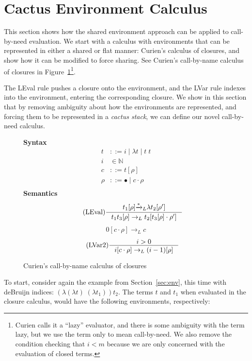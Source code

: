 \section{Cactus Environment Calculus} \label{sec:calc}

This section shows how the shared environment approach can be applied to
call-by-need evaluation. We start with a calculus with environments that can be
represented in either a shared or flat manner: Curien's calculus of closures,
and show how it can be modified to force sharing. See Curien's call-by-name
calculus of closures in Figure~\ref{fig:calcclos}\footnote{Curien calls it a
``lazy'' evaluator, and there is some ambiguity with the term lazy, but we use the
term only to mean call-by-need. We also remove the condition checking that $i <
m$ because we are only concerned with the evaluation of closed terms.}.

The LEval rule pushes a closure onto the environment, and the LVar rule indexes
into the environment, entering the corresponding closure. We show in this
section that by removing ambiguity about how the environments are represented,
and forcing them to be represented in a \emph{cactus stack}, we can define our
novel call-by-need calculus.

\begin{figure}
\textbf{Syntax}
\begin{align*}
\tag{Term} t &::= i \; | \; \lambda t \; | \; t \; t  \\
\tag{Variable} i &\in \mathbb{N}  \\
\tag{Closure} c &::= t [\rho] \\
\tag{Environment} \rho &::= \bullet \; | \; c \cdot \rho \\
\end{align*}
\textbf{Semantics}
\begin{align*}
\tag{LEval}\inference
{t_1[\rho] {\xrightarrow{* }}_L \lambda t_2[\rho'] }
{t_1 t_3[\rho] \rightarrow_L t_2[t_3[\rho] \cdot \rho'] } 
\end{align*}
\begin{align*}
\tag{LVar1} 0[c \cdot \rho] \rightarrow_L c
\end{align*}
\begin{align*}
\tag{LVar2} \inference
{i > 0}
{i[c \cdot \rho] \rightarrow_L (i-1)[\rho]}
\end{align*}
\caption{Curien's call-by-name calculus of closures}
\label{fig:calcclos}
\end{figure}

To start, consider again the example from Section~\ref{sec:env}, this
time with deBruijn indices: $(\lambda(\lambda t) \; (\lambda t_1)) t_2$.  The
terms $t$ and $t_1$ when evaluated in the closure calculus, would have the
following environments, respectively: 

